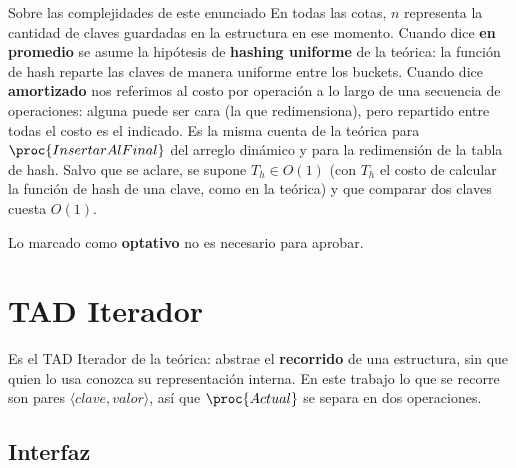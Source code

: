 \documentclass{article}
\begin{document}
\begin{regla}{Sobre las complejidades de este enunciado}
En todas las cotas, $n$ representa la cantidad de claves guardadas en la
estructura en ese momento. Cuando dice \textbf{en promedio} se asume la hipótesis de \textbf{hashing uniforme} de la teórica: la función de hash reparte las claves de manera uniforme entre los buckets.
Cuando dice \textbf{amortizado} nos referimos al costo por operación a
lo largo de una secuencia de operaciones: alguna puede ser cara (la que
redimensiona), pero repartido entre todas el costo es el indicado. Es la
misma cuenta de la teórica para $\proc{InsertarAlFinal}$ del arreglo
dinámico y para la redimensión de la tabla de hash.
Salvo que se aclare, se supone $T_h \in O(1)$ (con $T_h$ el costo de
calcular la función de hash de una clave, como en la teórica) y que
comparar dos claves cuesta $O(1)$.

Lo marcado como \textbf{optativo} no es necesario para aprobar.
\end{regla}

\section{TAD Iterador}
\label{sec:iterador}

Es el TAD Iterador de la teórica: abstrae el \textbf{recorrido} de una
estructura, sin que quien lo usa conozca su representación interna. En
este trabajo lo que se recorre son pares $\langle clave, valor \rangle$,
así que $\proc{Actual}$ se separa en dos operaciones.

\subsection{Interfaz}
\end{document}
